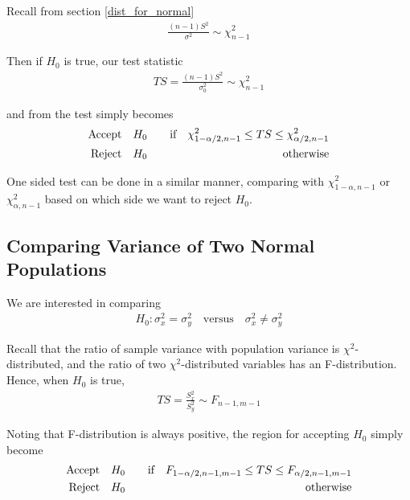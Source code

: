 \documentclass[../probability-notes.tex]{subfiles}
\begin{document}
    Recall from section \ref{dist_for_normal}
    \begin{align*}
        \frac{(n-1)S^{2}}{\sigma^{2}} \sim \chi_{n-1}^{2}
    \end{align*}

    Then if $H_{0}$ is true, our test statistic
    \begin{align*}
        TS = \frac{(n-1)S^{2}}{\sigma_{0}^{2}} \sim \chi_{n-1}^{2}
    \end{align*}

    and from the test simply becomes
    \begin{alignat*}{2}
        \text{Accept\quad} &H_{0} \quad &\text{if} \quad \chi_{1-\alpha/2, n-1}^{2} \leq TS \leq \chi_{\alpha/2, n-1}^{2}\\
        \text{Reject\quad} &H_{0} \quad &\text{otherwise}
    \end{alignat*}

    One sided test can be done in a similar manner, comparing with $\chi_{1-\alpha, n-1}^{2}$ or $\chi_{\alpha, n-1}^{2}$ based on which side we want to reject $H_{0}$.\newline

    \subsection{Comparing Variance of Two Normal Populations}
    We are interested in comparing
    \begin{align*}
        H_{0}: \sigma_{x}^{2} = \sigma_{y}^{2} \quad \text{versus} \quad \sigma_{x}^{2} \neq \sigma_{y}^{2}
    \end{align*}

    Recall that the ratio of sample variance with population variance is $\chi^{2}$-distributed, and the ratio of two $\chi^{2}$-distributed variables has an F-distribution. Hence, when $H_{0}$ is true,
    \begin{align*}
        TS = \frac{S_{x}^{2}}{S_{y}^{2}} \sim F_{n-1, m-1}
    \end{align*}

    Noting that F-distribution is always positive, the region for accepting $H_{0}$ simply become
    \begin{alignat*}{2}
        \text{Accept\quad} &H_{0} &\text{\quad if} \quad F_{1-\alpha/2, n-1, m-1} \leq TS \leq F_{\alpha/2, n-1, m-1}\\
        \text{Reject\quad} &H_{0} &\text{\quad otherwise}
    \end{alignat*}
\end{document}
